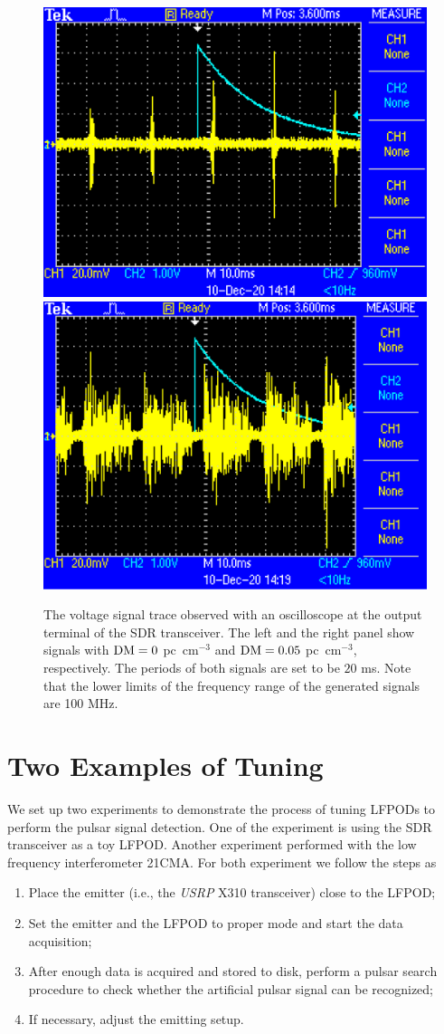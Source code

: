 \documentclass[fleqn,usenatbib]{mnras}
\begin{document}
\begin{figure}
    \centering
    \includegraphics[width=0.45\columnwidth]{dm_0_trace.eps}
    \includegraphics[width=0.45\columnwidth]{dm_0.05_trace.eps}
    \caption{The voltage signal trace observed with an oscilloscope at the output terminal of the SDR transceiver. The left and the right panel show signals with ${\rm DM}=0$ pc~cm$^{-3}$ and ${\rm DM}=0.05$ pc~cm$^{-3}$, respectively. The periods of both signals are set to be $20$ ms. Note that the lower limits of the frequency range of the generated signals are 100 MHz.}
    \label{fig:osc_trace}
\end{figure}

\section{Two Examples of Tuning}
We set up two experiments to demonstrate the process of tuning LFPODs to perform the pulsar signal detection. 
One of the experiment is using the SDR transceiver as a toy LFPOD.
Another experiment performed with the low frequency interferometer 21CMA.
For both experiment we follow the steps as
\begin{enumerate}
    \item Place the emitter (i.e., the \textit{USRP} X310 transceiver) close to the LFPOD;
    \item Set the emitter and the LFPOD to proper mode and start the data acquisition;
    \item After enough data is acquired and stored to disk, perform a pulsar search procedure to check whether the artificial pulsar signal can be recognized;
    \item If necessary, adjust the emitting setup.
\end{enumerate}
\end{document}
